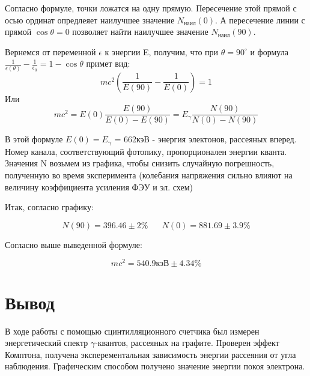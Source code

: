 \documentclass[a4paper]{article}
\begin{document}
\begin{enumerate}
    Согласно формуле, точки ложатся на одну прямую. Пересечение этой прямой с осью 
    ординат опредлеяет наилучшее значение $N_{\text{наил}}(0)$. А пересечение линии с прямой $\cos{\theta} = 0$
    позволяет найти наилучшее значение $N_{\text{наил}}(90)$.

    Вернемся от переменной $\epsilon$ к энергии E, получим, что при $\theta = 90^{\circ}$ и формула 
    $\frac{1}{\epsilon(\theta)} - \frac{1}{\epsilon_0} = 1 - \cos{\theta}$ примет вид:
    $$mc^2 \left( \frac{1}{E(90)} - \frac{1}{E(0)} \right) = 1$$
    Или 
    $$mc^2 = E(0) \frac{E(90)}{E(0) - E(90)} = E_{\gamma} \frac{N(90)}{N(0) - N(90)}$$

    В этой формуле $E(0) = E_{\gamma}$ = 662кэВ - энергия электонов, рассеяных вперед. Номер канала, соответствующий фотопику,
    пропорционален энергии кванта. Значения N возьмем из графика, чтобы снизить случайную погрешность, полученную во время эксперимента
    (колебания напряжения сильно влияют на величину коэффициента усиления ФЭУ и эл. схем)

    Итак, согласно графику:

    $$N(90) = 396.46 \pm 2 \% \;\;\;\;\;\; N(0) = 881.69 \pm 3.9 \%$$

    Согласно выше выведенной формуле:

    $$mc^2 = 540.9 \text{кэВ} \pm 4.34 \%$$


\end{enumerate}

\section{Вывод}

В ходе работы с помощью сцинтилляционного счетчика был измерен энергетический спектр $\gamma$-квантов,
рассеяных на графите. Проверен эффект Комптона, получена эксперементальная зависимость энергии рассеяния 
от угла наблюдения. Графическим способом получено значение энергии покоя электрона.
\end{document}
